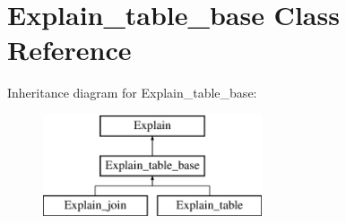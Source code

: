 \hypertarget{classExplain__table__base}{}\section{Explain\+\_\+table\+\_\+base Class Reference}
\label{classExplain__table__base}
Inheritance diagram for Explain\+\_\+table\+\_\+base\+:\begin{figure}[H]
\begin{center}
\leavevmode
\includegraphics[height=3.000000cm]{classExplain__table__base}
\end{center}
\end{figure}
